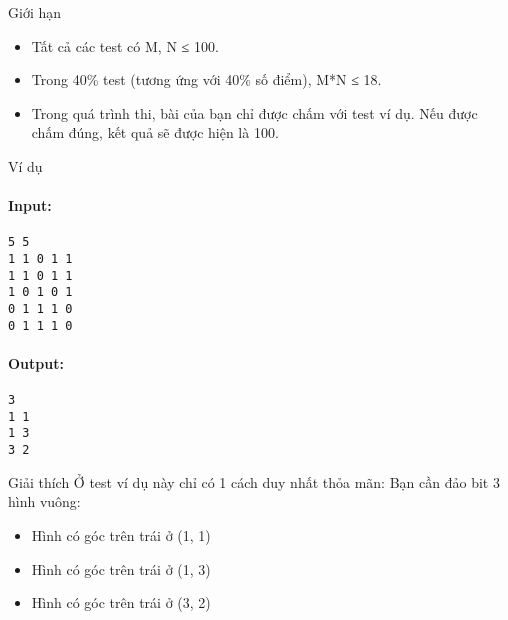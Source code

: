 Giới hạn
\begin{itemize}
	\item      Tất cả các test có M, N           ≤          100.    
	\item      Trong 40\% test (tương ứng với 40\% số điểm), M*N           ≤          18.    
	\item     Trong quá trình thi, bài của bạn chỉ được chấm với test ví dụ. Nếu được chấm đúng, kết quả sẽ được hiện là 100.   
\end{itemize}
Ví dụ
\paragraph{    Input:   }
\begin{verbatim}
5 5
1 1 0 1 1
1 1 0 1 1
1 0 1 0 1
0 1 1 1 0
0 1 1 1 0\end{verbatim}

\paragraph{\textbf{    Output:   }}
\begin{verbatim}
3
1 1
1 3
3 2\end{verbatim}
Giải thích
Ở test ví dụ này chỉ có 1 cách duy nhất thỏa mãn: Bạn cần đảo bit 3 hình vuông:  
\begin{itemize}
	\item     Hình có góc trên trái ở (1, 1)   
	\item     Hình có góc trên trái ở (1, 3)   
	\item     Hình có góc trên trái ở (3, 2)   
\end{itemize}